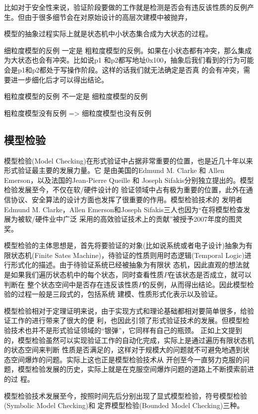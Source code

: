 比如对于安全性来说，验证阶段要做的工作就是检测是否会有违反该性质的反例产
生。但由于很多细节会在对原始设计的高层次建模中被抛弃，

模型的抽象过程实际上就是状态机中小状态集合成为大状态的过程。

细粒度模型的反例 一定是 粗粒度模型的反例。如果在小状态都有冲突，那么集成为大状态也会有冲突。比如说p1
和p2都写地址0x100，抽象后我们看到的行为可能会是p1和p2都处于写操作阶段。这样的话我们就无法确定是否真
的会有冲突，需要进一步细化后才可以得出结论。

粗粒度模型的反例 不一定是 细粒度模型的反例

粗粒度模型没有反例 => 细粒度模型也没有反例


\subsection{模型检验}
\label{sec:model-checking}

模型检验(Model Checking)在形式验证中占据非常重要的位置，也是近几十年以来形式验证最主要的发展力量。它
是由美国的Edmund M. Clarke 和 Allen Emerson\cite{WLP81_Clarke}，以及法国的Jean-Pierre
Queille 和 Joseph Sifakis\cite{EWATPN81_Queille}分别独立提出的。模型检验发展至今，不仅在软/硬件设计的
验证领域中占有极为重要的位置，此外在通信协议、安全算法的设计方面也发挥了很重要的作用。模型检验技术的
发明者Edmund M. Clarke，Allen Emerson和Joseph Sifakis三人也因为``在将模型检查发展为被软/硬件业中广泛
采用的高效验证技术上的贡献''被授予2007年度的图灵奖。

模型检验的主体思想是，首先将要验证的对象(比如说系统或者电子设计)抽象为有限状态机(Finite Sates
Machine)，待验证的性质则用时态逻辑(Temporal Logic)进行形式化的描述。由于待验证系统已经被抽象为有限状
态机，因此直观的想法就是如果我们遍历状态机中的每个状态，同时查看性质$P$在该状态是否成立，就可以判断在
整个状态空间中是否存在违反该性质$P$的反例，从而得出结论。因此模型检验的过程一般是三段式的，包括系统
建模、性质形式化表示以及验证。

模型检验相对于定理证明来说，由于实现方式和理论基础都相对要简单很多，给验证工作的进行带来了很大的便
利，也因此引领了形式验证技术的发展。但模型检验技术也并不是形式验证领域的``银弹''，它同样有自己的瓶颈。
正如上文提到的，模型检验虽然可以实现验证工作的自动化完成，实际上是通过遍历有限状态机的状态空间来判断
性质是否满足的，这样对于规模大的问题就不可避免地遇到状态空间爆炸的问题。实际上这也正是模型检验技术从
开创至今一直努力克服的问题，模型检验发展的历史，实际上就是在克服空间爆炸问题的道路上不断摸索前进的过
程。

模型检验技术发展至今，按照时间先后分别出现了显式模型检验，符号模型检验(Symbolic Model Checking)和
定界模型检验(Bounded Model Checking)三种。

